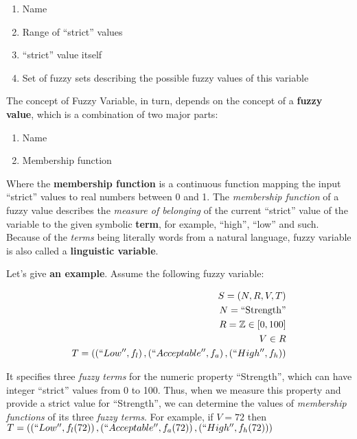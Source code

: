 \documentclass[11pt, a4paper]{article}
\begin{document}
  \begin{enumerate}
    \item Name
    \item Range of ``strict'' values
    \item ``strict'' value itself
    \item Set of fuzzy sets describing the possible fuzzy values of this variable
  \end{enumerate}

  The concept of Fuzzy Variable, in turn, depends on the concept of a \textbf{fuzzy value}, which is a combination of two major parts:

  \begin{enumerate}
    \item Name
    \item Membership function
  \end{enumerate}

  Where the \textbf{membership function} is a continuous function mapping the input ``strict'' values to real numbers between 0 and 1.
  The \textit{membership function} of a fuzzy value describes the \textit{measure of belonging} of the current ``strict'' value of the variable to the given symbolic \textbf{term},
  for example, ``high'', ``low'' and such.
  Because of the \textit{terms} being literally words from a natural language, fuzzy variable is also called a \textbf{linguistic variable}.

  Let's give \textbf{an example}.
  Assume the following fuzzy variable:

  \begin{eqnarray}
    S = \left(N, R, V, T\right)\\
    N = \textrm{``Strength''}\\
    R = \mathbb{Z} \in [0, 100]\\
    V \in R\\
    T = \left(\left(``Low'', f_l\right), \left(``Acceptable'', f_a\right), \left(``High'', f_h\right)\right)
  \end{eqnarray}

  It specifies three \textit{fuzzy terms} for the numeric property ``Strength'', which can have integer ``strict'' values from 0 to 100.
  Thus, when we measure this property and provide a strict value for ``Strength'', we can determine the values of \textit{membership functions} of its three \textit{fuzzy terms}.
  For example, if
    $V = 72$
  then
    $T = \left(\left(``Low'', f_l(72) \right), \left(``Acceptable'', f_a(72) \right), \left(``High'', f_h(72)\right)\right)$
\end{document}
